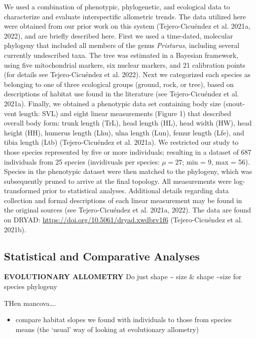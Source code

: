 \documentclass[
]{article}
\providecommand{\tightlist}{%
  \setlength{\itemsep}{0pt}\setlength{\parskip}{0pt}}
\begin{document}
We used a combination of phenotypic, phylogenetic, and ecological data
to characterize and evaluate interspectific allometric trends. The data
utilized here were obtained from our prior work on this system
(Tejero-Cicuéndez et al. 2021a, 2022), and are briefly described here.
First we used a time-dated, molecular phylogeny that included all
members of the genus \emph{Pristurus}, including several currently
undescribed taxa. The tree was estimated in a Bayesian framework, using
five mitochondrial markers, six nuclear markers, and 21 calibration
points (for details see Tejero-Cicuéndez et al. 2022). Next we
categorized each species as belonging to one of three ecological groups
(ground, rock, or tree), based on descriptions of habitat use found in
the literature (see Tejero-Cicuéndez et al. 2021a). Finally, we obtained
a phenotypic data set containing body size (snout-vent length: SVL) and
eight linear measurements (Figure 1) that described overall body form:
trunk length (TrL), head length (HL), head width (HW), head height (HH),
humerus length (Lhu), ulna length (Lun), femur length (Lfe), and tibia
length (Ltb) (Tejero-Cicuéndez et al. 2021a). We restricted our study to
those species represented by five or more individuals; resulting in a
dataset of 687 individuals from 25 species (invidivuals per species:
\(\mu=27\); min = 9, max = 56). Species in the phenotypic dataset were
then matched to the phylogeny, which was subsequently pruned to arrive
at the final topology. All measurements were log-transformed prior to
statistical analyses. Additional details regarding data collection and
formal descriptions of each linear measurement may be found in the
original sources (see Tejero-Cicuéndez et al. 2021a, 2022). The data are
found on DRYAD: \url{https://doi.org/10.5061/dryad.xwdbrv1f6}
(Tejero-Cicuéndez et al. 2021b).

\hypertarget{statistical-and-comparative-analyses}{%
\subsection{Statistical and Comparative
Analyses}\label{statistical-and-comparative-analyses}}

\textbf{EVOLUTIONARY ALLOMETRY} Do just shape \textasciitilde{} size \&
shape \textasciitilde size for species \textbar{} phylogeny

THen mancova\ldots.

\begin{itemize}
\tightlist
\item
  compare habitat slopes we found with individuals to those from species
  means (the `usual' way of looking at evolutionary allometry)
\end{itemize}
\end{document}
